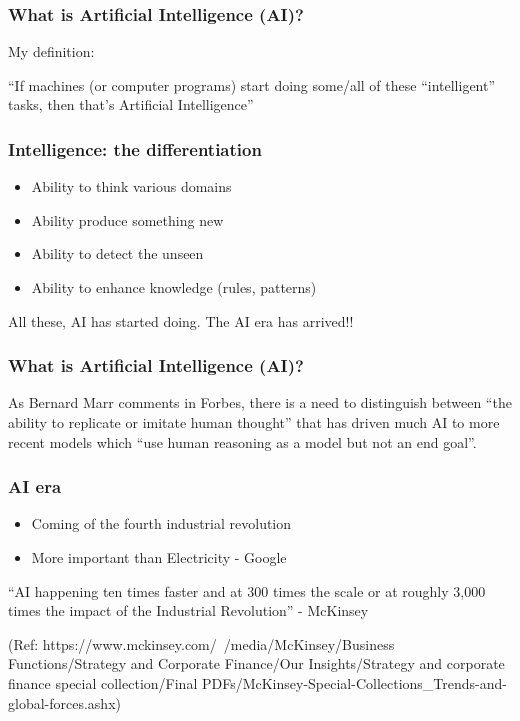 \begin{frame}[fragile]\frametitle{ What is Artificial Intelligence (AI)?}
My definition:


``If machines (or computer programs) start doing some/all of these ``intelligent'' tasks, then that's Artificial Intelligence''

\end{frame}

\begin{frame}[fragile]\frametitle{ Intelligence: the differentiation}
\begin{itemize}
\item Ability to think various domains
\item Ability produce something new
\item Ability to detect the unseen
\item Ability to enhance knowledge (rules, patterns)
\end{itemize}
All these, AI has started doing. The AI era has arrived!!
\end{frame}

\begin{frame}[fragile]\frametitle{ What is Artificial Intelligence (AI)?}
 As Bernard Marr comments in Forbes, there is a need to distinguish between ``the ability to replicate or imitate human thought'' that has driven much AI to more recent models which ``use human reasoning as a model but not an end goal''.

\end{frame}



\begin{frame}[fragile]\frametitle{AI era}
\begin{itemize}
\item Coming of the fourth industrial revolution
\item More important than Electricity - Google
\end{itemize}

``AI happening ten times faster and at 300 times the scale or at roughly 3,000 times the impact of the Industrial Revolution'' - McKinsey

{\tiny (Ref: https://www.mckinsey.com/~/media/McKinsey/Business Functions/Strategy and Corporate Finance/Our Insights/Strategy and corporate finance special collection/Final PDFs/McKinsey-Special-Collections\_Trends-and-global-forces.ashx)}
\end{frame}

